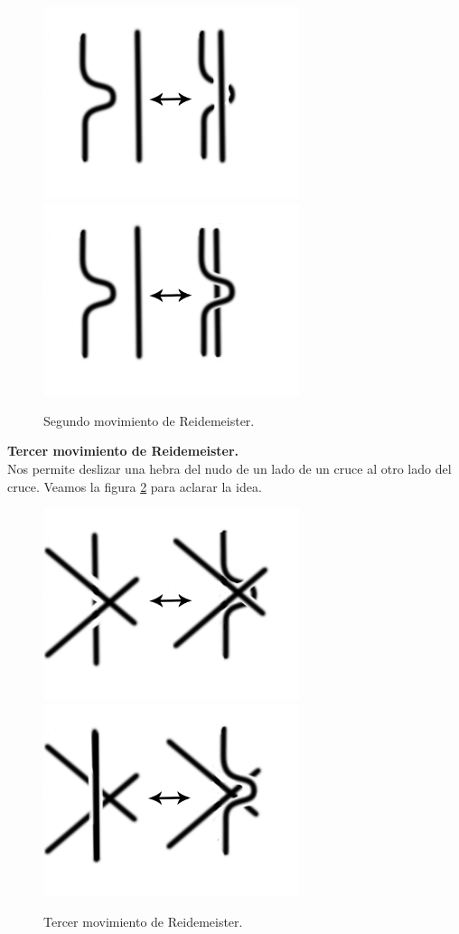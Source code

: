 \documentclass[14pt]{extarticle}
\begin{document}
    \begin{figure}[h!]
    	\includegraphics[width=7.5cm]{movi3.png}
    	\includegraphics[width=7.5cm]{movi4.png}
    	\centering
    	\caption{Segundo movimiento de Reidemeister.}
    	\label{movi2} 
    \end{figure}
    
	\textbf{Tercer movimiento de Reidemeister.}\\
Nos permite deslizar una hebra del nudo de un lado de un cruce al otro lado del cruce. Veamos la figura \ref{movi3} para aclarar la idea.
      \begin{figure}[h!]
      	\includegraphics[width=7.5cm]{movi5.png}
      	\includegraphics[width=7.5cm]{movi6.png}
      	\centering
      	\caption{Tercer movimiento de Reidemeister.}
      	\label{movi3} 
      \end{figure}
  
\end{document}
